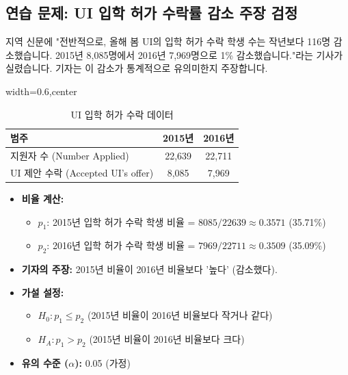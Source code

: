 \documentclass[11pt,a4paper]{article}
\theoremstyle{definition}
\begin{document}
\subsection{연습 문제: UI 입학 허가 수락률 감소 주장 검정}
\begin{examplebox}[title=시나리오:]
지역 신문에 "전반적으로, 올해 봄 UI의 입학 허가 수락 학생 수는 작년보다 116명 감소했습니다. 2015년 8,085명에서 2016년 7,969명으로 1\% 감소했습니다."라는 기사가 실렸습니다. 기자는 이 감소가 통계적으로 유의미한지 주장합니다.
\end{examplebox}

\begin{table}[h!]
\caption{UI 입학 허가 수락 데이터}
\label{tab:ui_admission_data}
\centering
\begin{adjustbox}{width=0.6\textwidth,center}
\begin{tabular}{lcc}
\toprule
\textbf{범주} & \textbf{2015년} & \textbf{2016년} \\
\midrule
지원자 수 (Number Applied) & 22,639 & 22,711 \\
UI 제안 수락 (Accepted UI's offer) & 8,085 & 7,969 \\
\bottomrule
\end{tabular}
\end{adjustbox}
\end{table}

\begin{itemize}
    \item \textbf{비율 계산:}
    \begin{itemize}
        \item $p_1$: 2015년 입학 허가 수락 학생 비율 = $8085 / 22639 \approx 0.3571$ (35.71\%)
        \item $p_2$: 2016년 입학 허가 수락 학생 비율 = $7969 / 22711 \approx 0.3509$ (35.09\%)
    \end{itemize}
    \item \textbf{기자의 주장:} 2015년 비율이 2016년 비율보다 '높다' (감소했다).
    \item \textbf{가설 설정:}
    \begin{itemize}
        \item $H_0: p_1 \le p_2$ (2015년 비율이 2016년 비율보다 작거나 같다)
        \item $H_A: p_1 > p_2$ (2015년 비율이 2016년 비율보다 크다)
    \end{itemize}
    \item \textbf{유의 수준 ($\alpha$):} 0.05 (가정)
\end{itemize}
\end{document}
